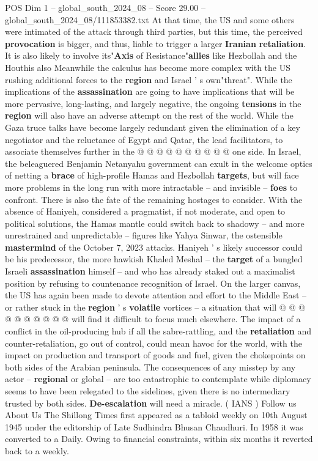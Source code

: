 \begin{textsample}{POS Dim 1 – global\_south\_2024\_08 – Score 29.00 – global\_south\_2024\_08/111853382.txt}
At that time, the US and some others were intimated of the attack through third parties, but this time, the perceived \textbf{provocation} is bigger, and thus, liable to trigger a larger \textbf{Iranian} \textbf{retaliation}.
It is also likely to involve its"\textbf{Axis} of Resistance"\textbf{allies} like Hezbollah and the Houthis also Meanwhile the calculus has become more complex with the US rushing additional forces to the \textbf{region} and Israel ' s own"threat".
While the implications of the \textbf{assassination} are going to have implications that will be more pervasive, long-lasting, and largely negative, the ongoing \textbf{tensions} in the \textbf{region} will also have an adverse attempt on the rest of the world.
While the Gaza truce talks have become largely redundant given the elimination of a key negotiator and the reluctance of Egypt and Qatar, the lead facilitators, to associate themselves further in the @ @ @ @ @ @ @ @ @ @ one side.
In Israel, the beleaguered Benjamin Netanyahu government can exult in the welcome optics of netting a \textbf{brace} of high-profile Hamas and Hezbollah \textbf{targets}, but will face more problems in the long run with more intractable -- and invisible -- \textbf{foes} to confront.
There is also the fate of the remaining hostages to consider.
With the absence of Haniyeh, considered a pragmatist, if not moderate, and open to political solutions, the Hamas mantle could switch back to shadowy -- and more unrestrained and unpredictable -- figures like Yahya Sinwar, the ostensible \textbf{mastermind} of the October 7, 2023 attacks.
Haniyeh ' s likely successor could be his predecessor, the more hawkish Khaled Meshal -- the \textbf{target} of a bungled Israeli \textbf{assassination} himself -- and who has already staked out a maximalist position by refusing to countenance recognition of Israel.
On the larger canvas, the US has again been made to devote attention and effort to the Middle East -- or rather stuck in the \textbf{region} ' s \textbf{volatile} vortices -- a situation that will @ @ @ @ @ @ @ @ @ @ will find it difficult to focus much elsewhere.
The impact of a conflict in the oil-producing hub if all the sabre-rattling, and the \textbf{retaliation} and counter-retaliation, go out of control, could mean havoc for the world, with the impact on production and transport of goods and fuel, given the chokepoints on both sides of the Arabian peninsula.
The consequences of any misstep by any actor -- \textbf{regional} or global -- are too catastrophic to contemplate while diplomacy seems to have been relegated to the sidelines, given there is no intermediary trusted by both sides. \textbf{De-escalation} will need a miracle. ( IANS ) Follow us About Us The Shillong Times first appeared as a tabloid weekly on 10th August 1945 under the editorship of Late Sudhindra Bhusan Chaudhuri.
In 1958 it was converted to a Daily.
Owing to financial constraints, within six months it reverted back to a weekly.


\end{textsample}
